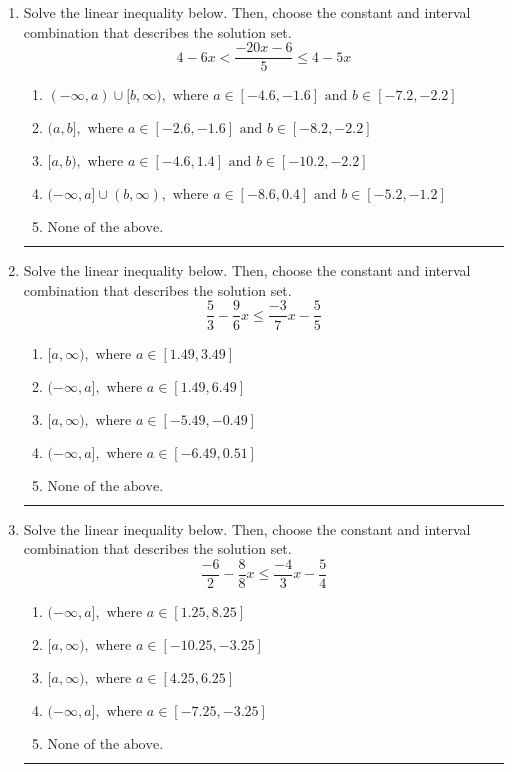 \documentclass[14pt]{extbook}
\newcommand{\litem}[1]{\item#1\hspace*{-1cm}\rule{\textwidth}{0.4pt}}
\begin{document}
\begin{enumerate}
{\begin{enumerate}[label=\Alph*.]
\end{enumerate} }
\litem{
Solve the linear inequality below. Then, choose the constant and interval combination that describes the solution set.\[ 4 - 6 x < \frac{-20 x - 6}{5} \leq 4 - 5 x \]\begin{enumerate}[label=\Alph*.]
\item \( (-\infty, a) \cup [b, \infty), \text{ where } a \in [-4.6, -1.6] \text{ and } b \in [-7.2, -2.2] \)
\item \( (a, b], \text{ where } a \in [-2.6, -1.6] \text{ and } b \in [-8.2, -2.2] \)
\item \( [a, b), \text{ where } a \in [-4.6, 1.4] \text{ and } b \in [-10.2, -2.2] \)
\item \( (-\infty, a] \cup (b, \infty), \text{ where } a \in [-8.6, 0.4] \text{ and } b \in [-5.2, -1.2] \)
\item \( \text{None of the above.} \)

\end{enumerate} }
\litem{
Solve the linear inequality below. Then, choose the constant and interval combination that describes the solution set.\[ \frac{5}{3} - \frac{9}{6} x \leq \frac{-3}{7} x - \frac{5}{5} \]\begin{enumerate}[label=\Alph*.]
\item \( [a, \infty), \text{ where } a \in [1.49, 3.49] \)
\item \( (-\infty, a], \text{ where } a \in [1.49, 6.49] \)
\item \( [a, \infty), \text{ where } a \in [-5.49, -0.49] \)
\item \( (-\infty, a], \text{ where } a \in [-6.49, 0.51] \)
\item \( \text{None of the above}. \)

\end{enumerate} }
\litem{
Solve the linear inequality below. Then, choose the constant and interval combination that describes the solution set.\[ \frac{-6}{2} - \frac{8}{8} x \leq \frac{-4}{3} x - \frac{5}{4} \]\begin{enumerate}[label=\Alph*.]
\item \( (-\infty, a], \text{ where } a \in [1.25, 8.25] \)
\item \( [a, \infty), \text{ where } a \in [-10.25, -3.25] \)
\item \( [a, \infty), \text{ where } a \in [4.25, 6.25] \)
\item \( (-\infty, a], \text{ where } a \in [-7.25, -3.25] \)
\item \( \text{None of the above}. \)


\end{enumerate}}
\end{enumerate}
\end{document}
